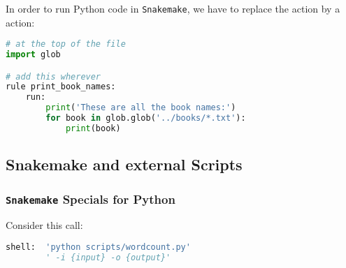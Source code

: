 \begin{frame}[fragile]
  \frametitle{}
  \vspace{-0.5em}
  In order to run Python code in \texttt{Snakemake}, we have to replace the  action by a  action:\vspace{-0.5em}
  \vspace{-0.5em}
  \begin{lstlisting}[language=Python,style=Python, basicstyle=\footnotesize]
# at the top of the file
import glob

# add this wherever
rule print_book_names:
    run:
        print('These are all the book names:')
        for book in glob.glob('../books/*.txt'):
            print(book)

  \end{lstlisting}\vspace{-0.5em}
  \pause\footnotesize
\end{frame}

\subsection{Snakemake and external Scripts}

\begin{frame}[fragile]
  \frametitle{\texttt{Snakemake} Specials for Python}
  Consider this call:
  \begin{lstlisting}[language=Python,style=Python]
shell:  'python scripts/wordcount.py'
        ' -i {input} -o {output}'
  \end{lstlisting}
\end{frame}

